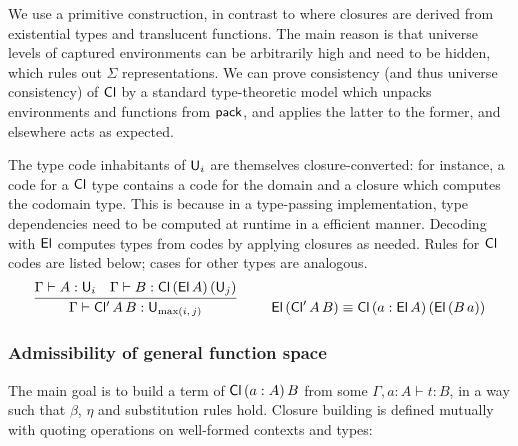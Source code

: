 \documentclass[a4paper]{easychair}
\begin{document}
We use a primitive construction, in contrast to
\cite{minamide1996typed} where closures are derived from existential
types and translucent functions. The main reason is that universe
levels of captured environments can be arbitrarily high and need to be
hidden, which rules out $\Sigma$ representations. We can prove
consistency (and thus universe consistency) of $\mathsf{Cl}$ by a standard
type-theoretic model which unpacks environments and functions from
$\mathsf{pack}$, and applies the latter to the former, and elsewhere acts as
expected.

The type code inhabitants of $\mathsf{U}_i$ are themselves closure-converted:
for instance, a code for a $\mathsf{Cl}$ type contains a code for the domain
and a closure which computes the codomain type. This is because in a
type-passing implementation, type dependencies need to be computed at
runtime in a efficient manner. Decoding with $\mathsf{El}$ computes types from
codes by applying closures as needed. Rules for $\mathsf{Cl}$ codes are listed
below; cases for other types are analogous.
\vspace{0.5em}
\begin{gather*}
  \infer{\Gamma \vdash \mathsf{Cl'}\,A\,B : \U_{\max(i,\,j)}}
        {\Gamma \vdash A : \U_i & \Gamma \vdash B : \Cl\,(\El\,A)\,(\U_j)}
  \hspace{2.5em}
  \El\,(\mathsf{Cl'}\,A\,B)\equiv \Cl\,(a : \El\,A)\,(\El\,(B\,a))
\end{gather*}

\subsubsection*{Admissibility of general function space}

The main goal is to build a term of $\mathsf{Cl}\,(a : A)\,B$ from some $\Gamma, a : A \vdash t : B$, in a way such that $\beta$, $\eta$ and substitution rules hold. Closure building is defined mutually with quoting operations on well-formed contexts and types:

\end{document}
